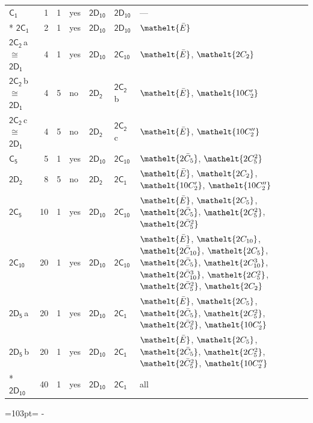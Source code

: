 \documentclass[10pt,a4paper]{article}
\newcommand{\needspace}[1]{\par\penalty-100\begingroup\dimen0=#1\relax\dimen2=\pagegoal
  \advance\dimen2-\pagetotal\ifdim\dimen0>\dimen2\relax\ifdim\dimen2>0pt\vfil\break\fi\fi
  \endgroup}
\numberwithin{equation}{section}
\newcommand{\eltfont}[1]{{\let\sigma\eltsigma\mathelt{#1}}}
\newcommand{\grp}[1]{\mathsf{#1}}
\newcommand{\cls}[1]{\eltfont{#1}}
\newcommand{\samecls}{\cong}
\newcommand{\clsletter}[1]{\,{\scriptsize\color{black!55}#1}}
\newcommand{\barred}[1]{\bar{#1}}
\newlength{\fillwidth}\newlength{\cellwidth}\newlength{\colwidth}
\begin{document}
{\begin{longtable}{@{}lrrlll>{\RaggedRight\arraybackslash}p{\fillwidth}@{}}
\bottomrule\endfoot\endlastfoot
\href{C1.pdf}{$\grp{C_{1}}$} & 1 & 1 & yes & \href{2D10.pdf}{$\grp{2D_{10}}$} & \href{2D10.pdf}{$\grp{2D_{10}}$} & ---\\*
\href{2C1.pdf}{$\grp{2C_{1}}$} & 2 & 1 & yes & \href{2D10.pdf}{$\grp{2D_{10}}$} & \href{2D10.pdf}{$\grp{2D_{10}}$} & $\cls{\barred{E}}$\\
\href{2C2.pdf}{$\grp{2C_{2}}$}\clsletter{a} $\samecls$ \href{2D1.pdf}{$\grp{2D_{1}}$} & 4 & 1 & yes & \href{2D10.pdf}{$\grp{2D_{10}}$} & \href{2C10.pdf}{$\grp{2C_{10}}$} & $\cls{\barred{E}}$, $\cls{2C_{2}}$\\
\href{2C2.pdf}{$\grp{2C_{2}}$}\clsletter{b} $\samecls$ \href{2D1.pdf}{$\grp{2D_{1}}$} & 4 & 5 & no & \href{2D2.pdf}{$\grp{2D_{2}}$} & \href{2C2.pdf}{$\grp{2C_{2}}$}\clsletter{b} & $\cls{\barred{E}}$, $\cls{10C_{2}'}$\\
\href{2C2.pdf}{$\grp{2C_{2}}$}\clsletter{c} $\samecls$ \href{2D1.pdf}{$\grp{2D_{1}}$} & 4 & 5 & no & \href{2D2.pdf}{$\grp{2D_{2}}$} & \href{2C2.pdf}{$\grp{2C_{2}}$}\clsletter{c} & $\cls{\barred{E}}$, $\cls{10C_{2}''}$\\
\href{C5.pdf}{$\grp{C_{5}}$} & 5 & 1 & yes & \href{2D10.pdf}{$\grp{2D_{10}}$} & \href{2C10.pdf}{$\grp{2C_{10}}$} & $\cls{2\barred{C}_{5}}$, $\cls{2C_{5}^{2}}$\\
\href{2D2.pdf}{$\grp{2D_{2}}$} & 8 & 5 & no & \href{2D2.pdf}{$\grp{2D_{2}}$} & \href{2C1.pdf}{$\grp{2C_{1}}$} & $\cls{\barred{E}}$, $\cls{2C_{2}}$, $\cls{10C_{2}'}$, $\cls{10C_{2}''}$\\
\href{2C5.pdf}{$\grp{2C_{5}}$} & 10 & 1 & yes & \href{2D10.pdf}{$\grp{2D_{10}}$} & \href{2C10.pdf}{$\grp{2C_{10}}$} & $\cls{\barred{E}}$, $\cls{2C_{5}}$, $\cls{2\barred{C}_{5}}$, $\cls{2C_{5}^{2}}$, $\cls{2\barred{C}_{5}^{2}}$\\
\href{2C10.pdf}{$\grp{2C_{10}}$} & 20 & 1 & yes & \href{2D10.pdf}{$\grp{2D_{10}}$} & \href{2C10.pdf}{$\grp{2C_{10}}$} & $\cls{\barred{E}}$, $\cls{2C_{10}}$, $\cls{2\barred{C}_{10}}$, $\cls{2C_{5}}$, $\cls{2\barred{C}_{5}}$, $\cls{2C_{10}^{3}}$, $\cls{2\barred{C}_{10}^{3}}$, $\cls{2C_{5}^{2}}$, $\cls{2\barred{C}_{5}^{2}}$, $\cls{2C_{2}}$\\
\href{2D5.pdf}{$\grp{2D_{5}}$}\clsletter{a} & 20 & 1 & yes & \href{2D10.pdf}{$\grp{2D_{10}}$} & \href{2C1.pdf}{$\grp{2C_{1}}$} & $\cls{\barred{E}}$, $\cls{2C_{5}}$, $\cls{2\barred{C}_{5}}$, $\cls{2C_{5}^{2}}$, $\cls{2\barred{C}_{5}^{2}}$, $\cls{10C_{2}'}$\\
\href{2D5.pdf}{$\grp{2D_{5}}$}\clsletter{b} & 20 & 1 & yes & \href{2D10.pdf}{$\grp{2D_{10}}$} & \href{2C1.pdf}{$\grp{2C_{1}}$} & $\cls{\barred{E}}$, $\cls{2C_{5}}$, $\cls{2\barred{C}_{5}}$, $\cls{2C_{5}^{2}}$, $\cls{2\barred{C}_{5}^{2}}$, $\cls{10C_{2}''}$\\*
\href{2D10.pdf}{$\grp{2D_{10}}$} & 40 & 1 & yes & \href{2D10.pdf}{$\grp{2D_{10}}$} & \href{2C1.pdf}{$\grp{2C_{1}}$} & all\\
\bottomrule\end{longtable}}
\needspace{103pt}
\end{document}
